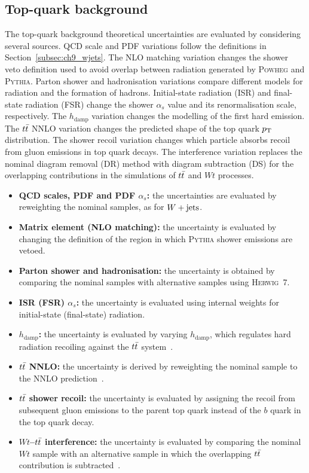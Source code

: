 \subsection{Top-quark background}
\label{subsec:ch9_top}
The top-quark background theoretical uncertainties are evaluated by considering several sources.
QCD scale and PDF variations follow the definitions in Section~\ref{subsec:ch9_wjets}.
The NLO matching variation changes the shower veto definition used to avoid overlap between radiation generated by \textsc{Powheg} and \textsc{Pythia}.
Parton shower and hadronisation variations compare different models for radiation and the formation of hadrons.
Initial-state radiation (ISR) and final-state radiation (FSR) change the shower $\alpha_s$ value and its renormalisation scale, respectively.
The $h_{\mathrm{damp}}$ variation changes the modelling of the first hard emission.
The $t\bar{t}$ NNLO variation changes the predicted shape of the top quark $p_{\mathrm{T}}$ distribution.
The shower recoil variation changes which particle absorbs recoil from gluon emissions in top quark decays.
The interference variation replaces the nominal diagram removal (DR) method with diagram subtraction (DS) for the overlapping contributions in the simulations of $t\bar{t}$ and $Wt$ processes.
\begin{itemize}[nosep,leftmargin=*]
    \item \textbf{QCD scales, PDF and PDF $\alpha_s$:} the uncertainties are evaluated by reweighting the nominal samples, as for $W+\mathrm{jets}$.
    \item \textbf{Matrix element (NLO matching):} the uncertainty is evaluated by changing the definition of the region in which \textsc{Pythia} shower emissions are vetoed.
    \item \textbf{Parton shower and hadronisation:} the uncertainty is obtained by comparing the nominal samples with alternative samples using \textsc{Herwig}~7.
    \item \textbf{ISR (FSR) $\alpha_s$:} the uncertainty is evaluated using internal weights for initial-state (final-state) radiation.
    \item \textbf{$h_{\mathrm{damp}}$:} the uncertainty is evaluated by varying $h_{\mathrm{damp}}$, which regulates hard radiation recoiling against the $t\bar{t}$ system~\cite{ATL-PHYS-PUB-2020-023}.
    \item \textbf{$t\bar{t}$ NNLO:} the uncertainty is derived by reweighting the nominal sample to the NNLO prediction~\cite{Czakon:2017wor}.
    \item \textbf{$t\bar{t}$ shower recoil:} the uncertainty is evaluated by assigning the recoil from subsequent gluon emissions to the parent top quark instead of the $b$ quark in the top quark decay.
    \item \textbf{$Wt$--$t\bar{t}$ interference:} the uncertainty is evaluated by comparing the nominal $Wt$ sample with an alternative sample in which the overlapping $t\bar{t}$ contribution is subtracted~\cite{Frixione:2008yi}.
\end{itemize}

